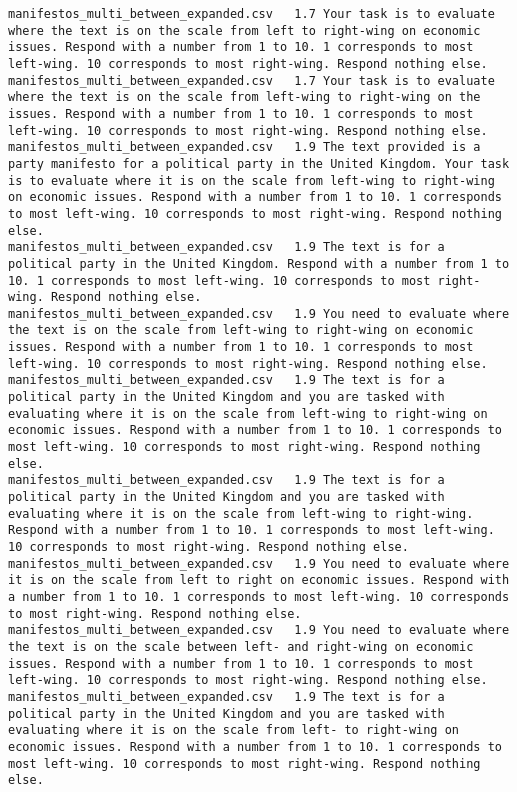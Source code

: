 \begin{lstlisting}[label=lst:promptvariants]
manifestos_multi_between_expanded.csv	1.7	Your task is to evaluate where the text is on the scale from left to right-wing on economic issues. Respond with a number from 1 to 10. 1 corresponds to most left-wing. 10 corresponds to most right-wing. Respond nothing else.
manifestos_multi_between_expanded.csv	1.7	Your task is to evaluate where the text is on the scale from left-wing to right-wing on the issues. Respond with a number from 1 to 10. 1 corresponds to most left-wing. 10 corresponds to most right-wing. Respond nothing else.
manifestos_multi_between_expanded.csv	1.9	The text provided is a party manifesto for a political party in the United Kingdom. Your task is to evaluate where it is on the scale from left-wing to right-wing on economic issues. Respond with a number from 1 to 10. 1 corresponds to most left-wing. 10 corresponds to most right-wing. Respond nothing else.
manifestos_multi_between_expanded.csv	1.9	The text is for a political party in the United Kingdom. Respond with a number from 1 to 10. 1 corresponds to most left-wing. 10 corresponds to most right-wing. Respond nothing else.
manifestos_multi_between_expanded.csv	1.9	You need to evaluate where the text is on the scale from left-wing to right-wing on economic issues. Respond with a number from 1 to 10. 1 corresponds to most left-wing. 10 corresponds to most right-wing. Respond nothing else.
manifestos_multi_between_expanded.csv	1.9	The text is for a political party in the United Kingdom and you are tasked with evaluating where it is on the scale from left-wing to right-wing on economic issues. Respond with a number from 1 to 10. 1 corresponds to most left-wing. 10 corresponds to most right-wing. Respond nothing else.
manifestos_multi_between_expanded.csv	1.9	The text is for a political party in the United Kingdom and you are tasked with evaluating where it is on the scale from left-wing to right-wing. Respond with a number from 1 to 10. 1 corresponds to most left-wing. 10 corresponds to most right-wing. Respond nothing else.
manifestos_multi_between_expanded.csv	1.9	You need to evaluate where it is on the scale from left to right on economic issues. Respond with a number from 1 to 10. 1 corresponds to most left-wing. 10 corresponds to most right-wing. Respond nothing else.
manifestos_multi_between_expanded.csv	1.9	You need to evaluate where the text is on the scale between left- and right-wing on economic issues. Respond with a number from 1 to 10. 1 corresponds to most left-wing. 10 corresponds to most right-wing. Respond nothing else.
manifestos_multi_between_expanded.csv	1.9	The text is for a political party in the United Kingdom and you are tasked with evaluating where it is on the scale from left- to right-wing on economic issues. Respond with a number from 1 to 10. 1 corresponds to most left-wing. 10 corresponds to most right-wing. Respond nothing else.

\end{lstlisting}
